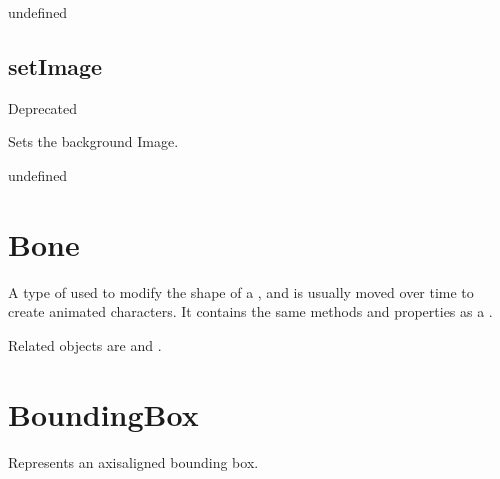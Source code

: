 \documentclass[letterpaper,12pt,english,openany,oneside]{sphinxmanual}
\begin{document}
\label{\detokenize{JS_3D_API:syntax-2}}

\begin{sphinxVerbatim}[commandchars=\\\{\}]
 
\end{sphinxVerbatim}


\label{\detokenize{JS_3D_API:section-3}}\label{\detokenize{JS_3D_API:returns-2}}

undefined


\subsection{setImage}
\label{\detokenize{JS_3D_API:setimage}}
Deprecated

Sets the background Image.

\label{\detokenize{JS_3D_API:syntax-3}}

\begin{sphinxVerbatim}[commandchars=\\\{\}]
\end{sphinxVerbatim}
\label{\detokenize{JS_3D_API:parameters-1}}

\label{\detokenize{JS_3D_API:section-4}}\label{\detokenize{JS_3D_API:returns-3}}

undefined


\section{Bone}
\label{\detokenize{JS_3D_API:bone}}
A type of  used to modify the shape of a  , and is usually moved over time to create animated characters. It contains the same methods and properties as a .

Related objects are  and .


\section{BoundingBox}
\label{\detokenize{JS_3D_API:boundingbox}}
Represents an axis\sphinxhyphen{}aligned bounding box.
\end{document}
